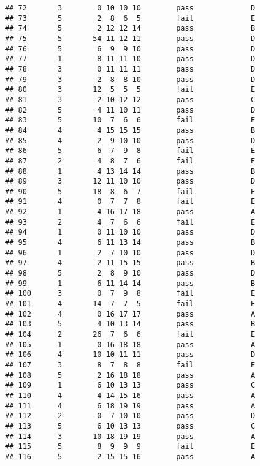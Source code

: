 \documentclass[
]{article}
\begin{document}
\begin{verbatim}
## 72       3        0 10 10 10        pass             D
## 73       5        2  8  6  5        fail             E
## 74       5        2 12 12 14        pass             B
## 75       5       54 11 12 11        pass             D
## 76       5        6  9  9 10        pass             D
## 77       1        8 11 11 10        pass             D
## 78       3        0 11 11 11        pass             D
## 79       3        2  8  8 10        pass             D
## 80       3       12  5  5  5        fail             E
## 81       3        2 10 12 12        pass             C
## 82       5        4 11 10 11        pass             D
## 83       5       10  7  6  6        fail             E
## 84       4        4 15 15 15        pass             B
## 85       4        2  9 10 10        pass             D
## 86       5        6  7  9  8        fail             E
## 87       2        4  8  7  6        fail             E
## 88       1        4 13 14 14        pass             B
## 89       3       12 11 10 10        pass             D
## 90       5       18  8  6  7        fail             E
## 91       4        0  7  7  8        fail             E
## 92       1        4 16 17 18        pass             A
## 93       2        4  7  6  6        fail             E
## 94       1        0 11 10 10        pass             D
## 95       4        6 11 13 14        pass             B
## 96       1        2  7 10 10        pass             D
## 97       4        2 11 15 15        pass             B
## 98       5        2  8  9 10        pass             D
## 99       1        6 11 14 14        pass             B
## 100      3        0  7  9  8        fail             E
## 101      4       14  7  7  5        fail             E
## 102      4        0 16 17 17        pass             A
## 103      5        4 10 13 14        pass             B
## 104      2       26  7  6  6        fail             E
## 105      1        0 16 18 18        pass             A
## 106      4       10 10 11 11        pass             D
## 107      3        8  7  8  8        fail             E
## 108      5        2 16 18 18        pass             A
## 109      1        6 10 13 13        pass             C
## 110      4        4 14 15 16        pass             A
## 111      4        6 18 19 19        pass             A
## 112      2        0  7 10 10        pass             D
## 113      5        6 10 13 13        pass             C
## 114      3       10 18 19 19        pass             A
## 115      5        8  9  9  9        fail             E
## 116      5        2 15 15 16        pass             A

\end{verbatim}
\end{document}
